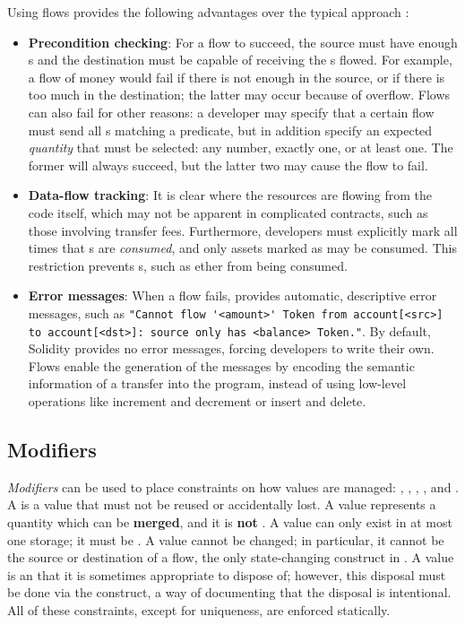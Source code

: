 \documentclass[dvipsnames, usenames, sigconf]{acmart}
\begin{document}
Using flows provides the following advantages over the typical approach :
\begin{itemize}
    \item \textbf{Precondition checking}: For a flow to succeed, the source must have enough \assetTxt{}s and the destination must be capable of receiving the \assetTxt{}s flowed.
        For example, a flow of money would fail if there is not enough in the source, or if there is too much in the destination; the latter may occur because of overflow.
        Flows can also fail for other reasons: a developer may specify that a certain flow must send all \assetTxt{}s matching a predicate, but in addition specify an expected \emph{quantity} that must be selected: any number, exactly one, or at least one.
        The former will always succeed, but the latter two may cause the flow to fail.
    \item \textbf{Data-flow tracking}: It is clear where the resources are flowing from the code itself, which may not be apparent in complicated contracts, such as those involving transfer fees.
        Furthermore, developers must explicitly mark all times that \assetTxt{}s are \emph{consumed}, and only assets marked as  may be consumed.
        This restriction prevents \assetTxt{}s, such as ether from being consumed.
    \item \textbf{Error messages}: When a flow fails, \langName provides automatic, descriptive error messages, such as \lstinline{"Cannot flow '<amount>' Token from account[<src>] to account[<dst>]: source only has <balance> Token."}.
        By default, Solidity provides no error messages, forcing developers to write their own.
        Flows enable the generation of the messages by encoding the semantic information of a transfer into the program, instead of using low-level operations like increment and decrement or insert and delete.
\end{itemize}

\subsection{Modifiers}\label{sec:lang-modifiers}
\emph{Modifiers} can be used to place constraints on how values are managed: , , , , and .
A  is a value that must not be reused or accidentally lost.
A  value represents a quantity which can be \textbf{merged}, and it is \textbf{not} .
A  value can only exist in at most one storage; it must be .
A  value cannot be changed; in particular, it cannot be the source or destination of a flow, the only state-changing construct in \langName {}.
A  value is an  that it is sometimes appropriate to dispose of; however, this disposal must be done via the  construct, a way of documenting that the disposal is intentional.
All of these constraints, except for uniqueness, are enforced statically.
\end{document}
